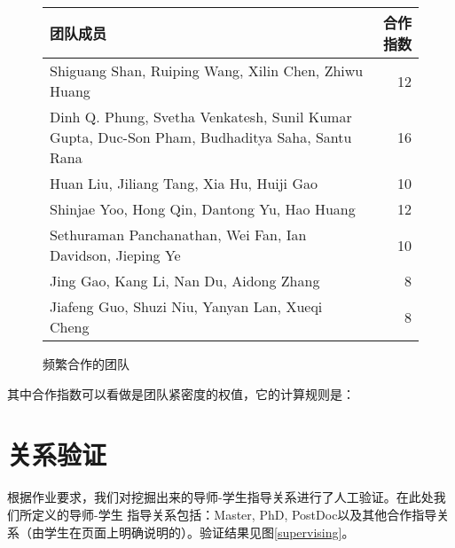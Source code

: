 \documentclass[a4paper]{article}
\begin{document}
\begin{figure}[ht]
  \begin{center}
    \begin{tabular}{m{12cm}r}
      \hline
      团队成员 & 合作指数 \\
      \hline
      Shiguang Shan, Ruiping Wang, Xilin Chen, Zhiwu Huang & 12 \\
      Dinh Q. Phung, Svetha Venkatesh, Sunil Kumar Gupta, Duc-Son Pham, Budhaditya Saha, Santu Rana
      & 16 \\
      Huan Liu, Jiliang Tang, Xia Hu, Huiji Gao & 10 \\
      Shinjae Yoo, Hong Qin, Dantong Yu, Hao Huang & 12 \\
      Sethuraman Panchanathan, Wei Fan, Ian Davidson, Jieping Ye & 10 \\
      Jing Gao, Kang Li, Nan Du, Aidong Zhang & 8 \\
      Jiafeng Guo, Shuzi Niu, Yanyan Lan, Xueqi Cheng & 8 \\
      \hline
    \end{tabular}
  \end{center}
  \caption{频繁合作的团队}
\end{figure}

其中合作指数可以看做是团队紧密度的权值，它的计算规则是：

\section{关系验证}
根据作业要求，我们对挖掘出来的导师-学生指导关系进行了人工验证。在此处我们所定义的导师-学生
指导关系包括：Master, PhD,
PostDoc以及其他合作指导关系（由学生在页面上明确说明的）。验证结果见图\ref{supervising}。
\end{document}
